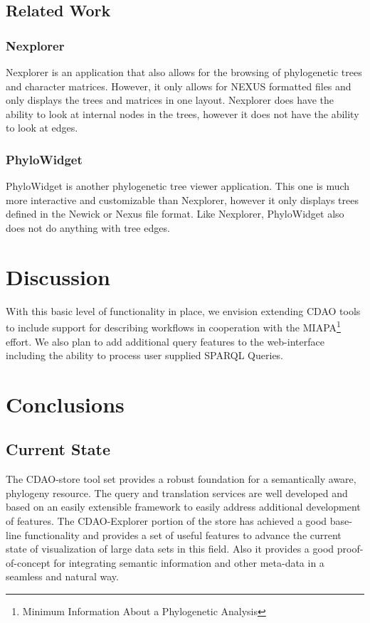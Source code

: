 \documentclass[10pt]{bmc_article}
\newenvironment{bmcformat}{\begin{raggedright}\baselineskip20pt\sloppy\setboolean{publ}{false}}{\end{raggedright}\baselineskip20pt\sloppy}
\begin{document}
\begin{bmcformat}
\subsection*{Related Work}
\subsubsection*{Nexplorer}
Nexplorer is an application that also allows for the browsing of phylogenetic
trees and character matrices.  However, it only allows for NEXUS formatted
files and only displays the trees and matrices in one layout.  Nexplorer does
have the ability to look at internal nodes in the trees, however it does not
have the ability to look at edges.  \subsubsection*{PhyloWidget} PhyloWidget is
another phylogenetic tree viewer application.  This one is much more
interactive and customizable than Nexplorer, however it only displays trees
defined in the Newick or Nexus file format.  Like Nexplorer, PhyloWidget also
does not do anything with tree edges.

\section*{Discussion}

  With this basic level of functionality in place, we envision extending CDAO tools to include support for describing
  workflows in cooperation with the MIAPA\footnote{Minimum Information About a Phylogenetic Analysis} effort.
  We also plan to add additional query features to the web-interface including the ability to process user supplied
  SPARQL Queries.
  

\section*{Conclusions}
   \subsection*{Current State}
     The CDAO-store tool set provides a robust foundation for a semantically aware, phylogeny resource. The query and translation
     services are well developed and based on an easily extensible framework to easily address additional development of features.
     The CDAO-Explorer portion of the store has achieved a good base-line functionality and provides a set of useful features
     to advance the current state of visualization of large data sets in this field. Also it provides a good proof-of-concept for
     integrating semantic information and other meta-data in a seamless and natural way. 


\end{bmcformat}
\end{document}
